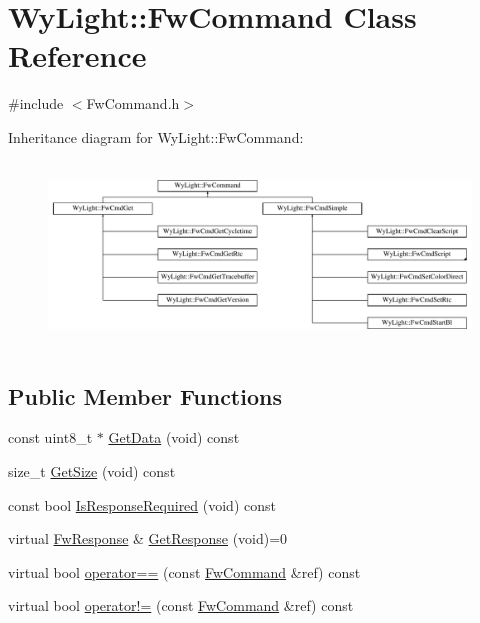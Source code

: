 \hypertarget{class_wy_light_1_1_fw_command}{\section{Wy\-Light\-:\-:Fw\-Command Class Reference}
\label{class_wy_light_1_1_fw_command}
}


{\ttfamily \#include $<$Fw\-Command.\-h$>$}

Inheritance diagram for Wy\-Light\-:\-:Fw\-Command\-:\begin{figure}[H]
\begin{center}
\leavevmode
\includegraphics[height=4.924623cm]{class_wy_light_1_1_fw_command}
\end{center}
\end{figure}
\subsection*{Public Member Functions}
\begin{DoxyCompactItemize}
\item 
const uint8\-\_\-t $\ast$ \hyperlink{class_wy_light_1_1_fw_command_ad891fbb6f1a2bed364a77760c574bc68}{Get\-Data} (void) const 
\item 
size\-\_\-t \hyperlink{class_wy_light_1_1_fw_command_af45ca242c24c497039ea3063d1d2bf06}{Get\-Size} (void) const 
\item 
const bool \hyperlink{class_wy_light_1_1_fw_command_a53887169da07e23ecdeec8739acc26ce}{Is\-Response\-Required} (void) const 
\item 
virtual \hyperlink{class_wy_light_1_1_fw_response}{Fw\-Response} \& \hyperlink{class_wy_light_1_1_fw_command_a37ae4cf77fd2787a9802dbb55ef489fe}{Get\-Response} (void)=0
\item 
virtual bool \hyperlink{class_wy_light_1_1_fw_command_adad943e35162c4967a7c7f1ff44e9b66}{operator==} (const \hyperlink{class_wy_light_1_1_fw_command}{Fw\-Command} \&ref) const 
\item 
virtual bool \hyperlink{class_wy_light_1_1_fw_command_a442a3756b34059192afc65f547d67094}{operator!=} (const \hyperlink{class_wy_light_1_1_fw_command}{Fw\-Command} \&ref) const 
\end{DoxyCompactItemize}
